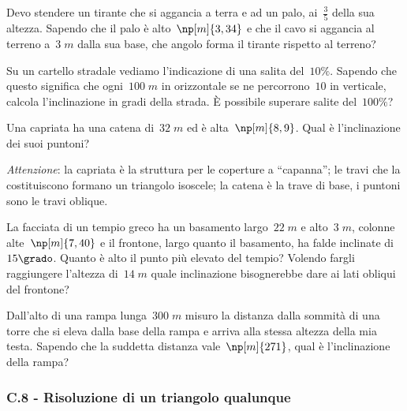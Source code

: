 \begin{multicols}{2}
\begin{esercizio}[\Ast]
\label{ese:C.63}
Devo stendere un tirante che si aggancia a terra e ad un palo, ai~$\frac{3}{5}$ della sua altezza.
Sapendo che il palo è alto~$\np[m]{3,34}$ e che il cavo si aggancia al terreno a~$3\;\unit{m}$ dalla sua base,
che angolo forma il tirante rispetto al terreno?
\end{esercizio}

\begin{esercizio}[\Ast]
\label{ese:C.64}
Su un cartello stradale vediamo l'indicazione di una salita del~$10\%$. Sapendo che questo significa che ogni~$100\;\unit{m}$
in orizzontale se ne percorrono~$10$ in verticale, calcola l'inclinazione in gradi della strada. È possibile superare salite del~$100\%$?
\end{esercizio}

\begin{esercizio}[\Ast]
\label{ese:C.65}
Una capriata ha una catena di~$32\;\unit{m}$ ed è alta~$\np[m]{8,9}$. Qual è l'inclinazione dei suoi puntoni?

\emph{Attenzione}: la capriata è la struttura per le coperture a ``capanna''; le travi che la costituiscono
formano un triangolo isoscele; la catena è la trave di base, i puntoni sono le travi oblique.
\end{esercizio}

\begin{esercizio}[\Ast]
\label{ese:C.66}
La facciata di un tempio greco ha un basamento largo~$22\;\unit{m}$ e alto~$3\;\unit{m}$, colonne alte~$\np[m]{7,40}$ e il frontone,
largo quanto il basamento, ha falde inclinate di~$15\grado$. Quanto è alto il punto più elevato del tempio?
Volendo fargli raggiungere l'altezza di~$14\;\unit{m}$ quale inclinazione bisognerebbe dare ai lati obliqui del frontone?
\end{esercizio}

\begin{esercizio}[\Ast]
\label{ese:C.67}
Dall'alto di una rampa lunga~$300\;\unit{m}$ misuro la distanza dalla sommità di una torre che si eleva dalla base della rampa e arriva
alla stessa altezza della mia testa. Sapendo che la suddetta distanza vale~$\np[m]{271}$, qual è l'inclinazione della rampa?
\end{esercizio}
\end{multicols}

\subsubsection*{C.8 - Risoluzione di un triangolo qualunque}

